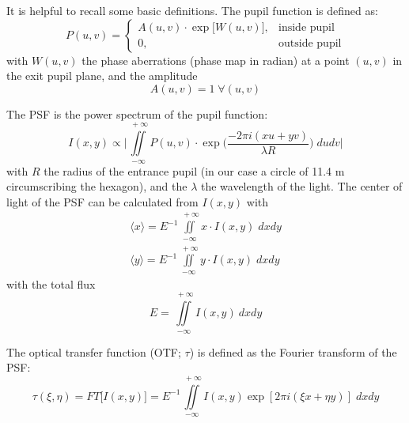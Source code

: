 
It is helpful to recall some basic definitions. The pupil function is defined as:
\begin{equation}
P(u,v) = \left\{\begin{array}{cl} A(u,v) \cdot \exp\big[W(u,v)\big], & \mbox{inside pupil}\\ 
0, & \mbox{outside pupil} \end{array}\right.
\end{equation}
with $W(u,v)$ the phase aberrations (phase map in radian) at a point $(u,v)$ in the exit pupil plane, and the amplitude
\begin{equation}\label{amp}
A(u,v) = 1 \; \forall (u,v)
\end{equation}

The PSF is the power spectrum of the pupil function:
\begin{equation}
I(x,y) \propto \Big \lvert \iint\limits_{-\infty}^{\: +\infty} P(u,v) \cdot \exp\Big(\frac{-2\pi i (xu+yv)}{\lambda R}\Big)\; dudv \Big \rvert
\end{equation}
with $R$ the radius of the entrance pupil (in our case a circle of 11.4 m circumscribing the hexagon), and the $\lambda$ the wavelength of the light. The center of light of the PSF can be calculated from $I(x,y)$ with
\begin{eqnarray}
\langle x \rangle = E^{-1} \iint\limits_{-\infty}^{\: +\infty} x \cdot I(x,y) \; dxdy \label{cl1}\\
\langle y \rangle = E^{-1} \iint\limits_{-\infty}^{\: +\infty} y \cdot I(x,y) \; dxdy \label{cl2}
\end{eqnarray}
with the total flux
\begin{equation}
E = \iint\limits_{-\infty}^{\; +\infty} I(x,y) \: dxdy
\end{equation}

The optical transfer function (OTF; $\tau$) is defined as the Fourier transform of the PSF:
\begin{equation}\label{ft}
\tau(\xi,\eta) = FT\big[I(x,y)\big] = E^{-1} \iint\limits_{-\infty}^{\: +\infty} I(x,y) \exp[2 \pi i (\xi x + \eta y)] \; dxdy
\end{equation}


